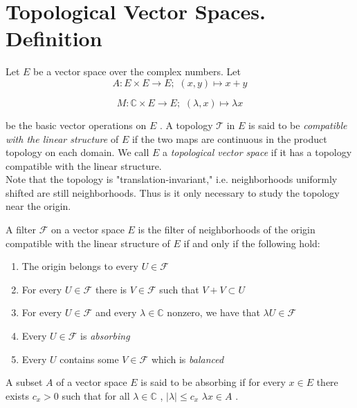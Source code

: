 \section{Topological Vector Spaces. Definition}

Let $ E $ be a vector space over the complex numbers. Let
\[
	A: E \times E \to E; \hspace{4pt} (x,y) \mapsto x+y
\]

\[
	M: \mathbb{C} \times E \to E; \hspace{4pt} ( \lambda, x) \mapsto \lambda x
\]

be the basic vector operations on $ E $ . A topology $ \mathcal{T} $ in $ E $ is said to be \textit{compatible with the linear structure} of $ E $ if the two maps are continuous in the product topology on each domain. We call $ E $ a \textit{topological vector space} if it has a topology compatible with the linear structure. \\

Note that the topology is "translation-invariant," i.e. neighborhoods uniformly shifted are still neighborhoods. Thus is it only necessary to study the topology near the origin. \\

\begin{thm}
	A filter $ \mathcal{F} $ on a vector space $ E $ is the filter of neighborhoods of the origin compatible with the linear structure of $ E $ if and only if the following hold:
	\begin{enumerate}
		\item The origin belongs to every $ U \in \mathcal{F} $ 
		\item For every $ U \in \mathcal{F} $ there is $ V \in \mathcal{F} $ such that $ V + V \subset U $ 
		\item For every $ U \in \mathcal{F} $ and every $ \lambda \in \mathbb{C} $ nonzero, we have that $ \lambda U \in \mathcal{F} $ 
		\item Every $ U \in \mathcal{F} $ is \textit{absorbing}
		\item Every $ U $ contains some $ V \in \mathcal{F} $ which is \textit{balanced}
	\end{enumerate}
	
\end{thm}

\begin{defn}
	A subset $ A $ of a vector space $ E $ is said to be absorbing if for every $ x \in E $ there exists $ c_{ x } > 0 $ such that for all $ \lambda \in \mathbb{C} $ , $ \vert \lambda \vert \leq c_{ x } $ $ \lambda x \in A $ . 
\end{defn}

